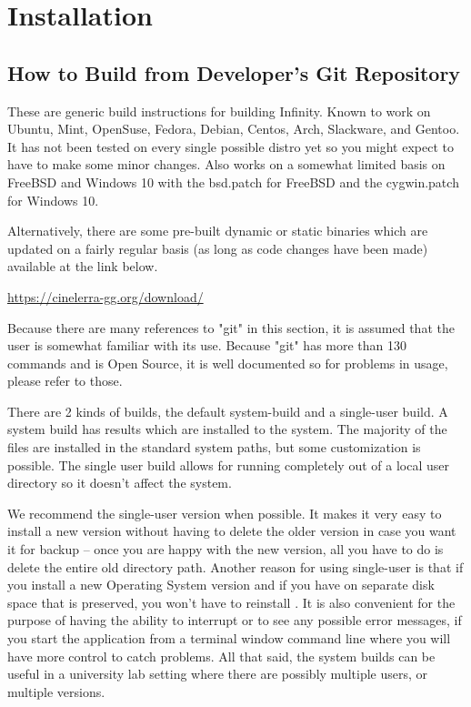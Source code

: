 \chapter{Installation}
\label{cha:Installation}
\section{How to Build \CGG{} from Developer's Git Repository}%
\label{sec:How_to_build}

These are generic build instructions for building \CGG{} Infinity.
Known to work on Ubuntu, Mint, OpenSuse, Fedora, Debian, Centos,
Arch, Slackware, and Gentoo.  It has not been tested on every
single possible distro yet so you might expect to have to make
some minor changes.  Also works on a somewhat limited basis on
FreeBSD and Windows 10 with the bsd.patch for FreeBSD and the
cygwin.patch for Windows 10.

Alternatively, there are some pre-built dynamic or static binaries
which are updated on a fairly regular basis (as long as code changes
have been made) available at the link below.
\begin{center}
  \href{https://cinelerra-gg.org/download/}{https://cinelerra-gg.org/download/}
\end{center}

Because there are many references to "git" in this section, it is
assumed that the user is somewhat familiar with its use.  Because
"git" has more than 130 commands and is Open Source, it is well
documented so for problems in usage, please refer to those.

There are 2 kinds of builds, the default system-build and a
single-user build.  A system build has results which are installed
to the system.  The majority of the files are installed in the
standard system paths, but some customization is possible.  The
single user build allows for running completely out of a local
user directory so it doesn't affect the system.

We recommend the single-user version when possible.  It makes it
very easy to install a new version without having to delete the
older version in case you want it for backup -- once you are happy
with the new version, all you have to do is delete the entire old
directory path.  Another reason for using single-user is that if
you install a new Operating System version and if you have \CGG{}
on separate disk space that is preserved, you won't have to
reinstall \CGG{}.  It is also convenient for the purpose of having
the ability to interrupt or to see any possible error messages, if
you start the application from a terminal window command line
where you will have more control to catch problems.  All that
said, the system builds can be useful in a university lab setting
where there are possibly multiple users, or multiple versions.

